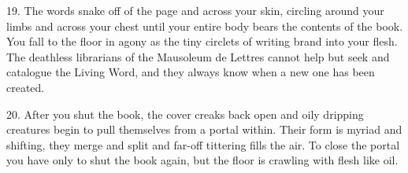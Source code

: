 19. The words snake off of the page and across your skin, circling around your limbs and across your chest until your entire body bears the contents of the book. You fall to the floor in agony as the tiny circlets of writing brand into your flesh. The deathless librarians of the Mausoleum de Lettres cannot help but seek and catalogue the Living Word, and they always know when a new one has been created.




20. After you shut the book, the cover creaks back open and oily dripping creatures begin to pull themselves from a portal within. Their form is myriad and shifting, they merge and split and far-off tittering fills the air.
To close the portal you have only to shut the book again, but the floor is crawling with flesh like oil.
